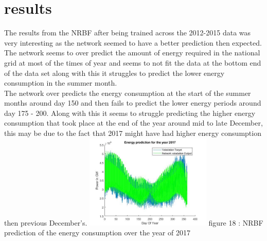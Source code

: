 \documentclass{IEEEtran}[11pt]
\begin{document}
\section{results}
\begin{flushleft}
  The results from the NRBF after being trained across the 2012-2015 data was
  very interesting as the network seemed to have a better prediction then expected.
  The network seems to over predict the amount of energy required in the national
  grid at most of the times of year and seems to not fit the data at the bottom
  end of the data set along with this it struggles to predict the  lower energy
  consumption in the summer month.
  \\
  \vspace{1.5mm}
  The network over predicts the energy consumption
  at the start of the summer months around day 150 and then fails to predict the
  lower energy periods around day 175 - 200. Along with this it seems to struggle
  predicting the higher energy consumption that took place at the end of the year
  around mid to late December, this may be due to the fact that 2017 might have
  had higher energy consumption then previous December's.
  \vspace{1.5mm}
  \includegraphics[width = 0.45\textwidth]{2017prediction.jpg}
  \vspace{1.5mm}
  {\footnotesize figure 18 : NRBF prediction of the energy consumption over the
  year of 2017 }
  \\
  \vspace{1.5mm}


\end{flushleft}
\end{document}
